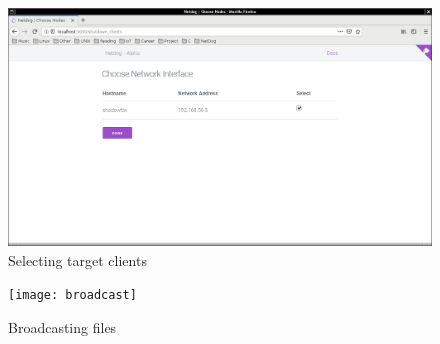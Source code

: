 \begin{figure}[H]
\includegraphics[scale=0.3]{target_clients}
\caption{Selecting target clients}
\end{figure}

\begin{figure}[H]
\texttt{[image: broadcast]}
\caption{Broadcasting files}
\end{figure}
